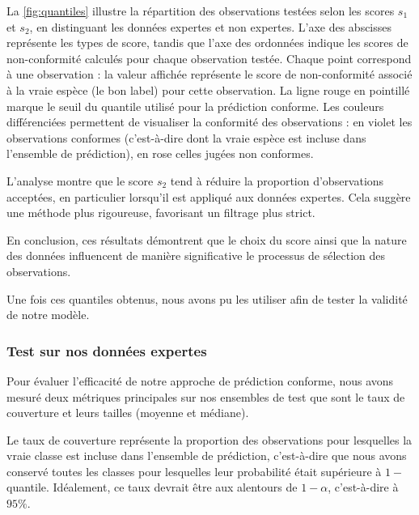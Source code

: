 \documentclass[a4paper,12pt]{article}
\begin{document}
\vspace{0.2cm}

La \autoref{fig:quantiles} illustre la répartition des observations testées selon les scores $s_1$ et $s_2$, en distinguant les données expertes et non expertes. L’axe des abscisses représente les types de score, tandis que l’axe des ordonnées indique les scores de non-conformité calculés pour chaque observation testée. Chaque point correspond à une observation : la valeur affichée représente le score de non-conformité associé à la vraie espèce (le bon label) pour cette observation. La ligne rouge en pointillé marque le seuil du quantile utilisé pour la prédiction conforme. Les couleurs différenciées permettent de visualiser la conformité des observations : en violet les observations conformes (c’est-à-dire dont la vraie espèce est incluse dans l’ensemble de prédiction), en rose celles jugées non conformes.

\vspace{0.2cm}

L’analyse montre que le score $s_2$ tend à réduire la proportion d’observations acceptées, en particulier lorsqu’il est appliqué aux données expertes. Cela suggère une méthode plus rigoureuse, favorisant un filtrage plus strict.

\vspace{0.2cm}

En conclusion, ces résultats démontrent que le choix du score ainsi que la nature des données influencent de manière significative le processus de sélection des observations.

\vspace{0.2cm}

Une fois ces quantiles obtenus, nous avons pu les utiliser afin de tester la validité de notre modèle.

\subsubsection{Test sur nos données expertes}

Pour évaluer l'efficacité de notre approche de prédiction conforme, nous avons mesuré deux métriques principales sur nos ensembles de test que sont le taux de couverture et leurs tailles (moyenne et médiane). 

\vspace{0.2cm}

Le taux de couverture représente la proportion des observations pour lesquelles la vraie classe est incluse dans l'ensemble de prédiction, c'est-à-dire que nous avons conservé toutes les classes pour lesquelles leur probabilité était supérieure à $1 -$ quantile. Idéalement, ce taux devrait être aux alentours de $1- \alpha$, c'est-à-dire à $95\%$.
\end{document}
